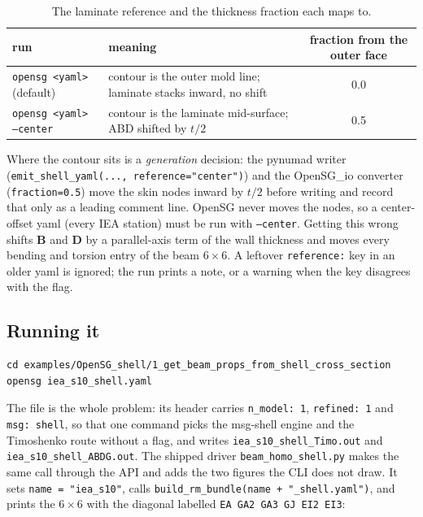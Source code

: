 \begin{table}[htbp]
\centering
\small
\caption{The laminate reference and the thickness fraction each maps to.}
\label{tab:input-reference}
\begin{tabular}{@{}llc@{}}
\toprule
run & meaning & fraction from the outer face \\
\midrule
\texttt{opensg <yaml>} (default) & contour is the outer mold line; laminate stacks inward, no shift & 0.0 \\
\texttt{opensg <yaml> --center} & contour is the laminate mid-surface; ABD shifted by $t/2$ & 0.5 \\
\bottomrule
\end{tabular}
\end{table}

Where the contour sits is a \emph{generation} decision: the pynumad writer
(\texttt{emit\_shell\_yaml(..., reference="center")}) and the OpenSG\_io
converter (\texttt{fraction=0.5}) move the skin nodes inward by $t/2$ before
writing and record that only as a leading comment line. OpenSG never moves the
nodes, so a center-offset yaml (every IEA station) must be run with
\texttt{--center}. Getting this wrong shifts $\mathbf{B}$ and $\mathbf{D}$ by a
parallel-axis term of the wall thickness and moves every bending and torsion
entry of the beam $6\times6$. A leftover \texttt{reference:} key in an older
yaml is ignored; the run prints a note, or a warning when the key disagrees with
the flag.

\subsection{Running it}

\begin{lstlisting}[style=shellst]
cd examples/OpenSG_shell/1_get_beam_props_from_shell_cross_section
opensg iea_s10_shell.yaml
\end{lstlisting}

The file is the whole problem: its header carries \texttt{n\_model: 1},
\texttt{refined: 1} and \texttt{msg: shell}, so that one command picks the
msg-shell engine and the Timoshenko route without a flag, and writes
\texttt{iea\_s10\_shell\_Timo.out} and \texttt{iea\_s10\_shell\_ABDG.out}. The
shipped driver \texttt{beam\_homo\_shell.py} makes the same call through the
API and adds the two figures the CLI does not draw. It sets
\texttt{name = "iea\_s10"}, calls
\texttt{build\_rm\_bundle(name + "\_shell.yaml")}, and prints the $6\times6$
with the diagonal labelled \texttt{EA GA2 GA3 GJ EI2 EI3}:

